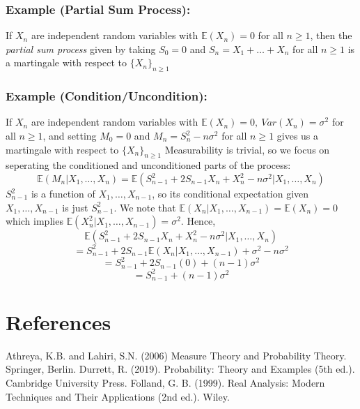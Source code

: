 \documentclass{article}
\begin{document}
\subsubsection{Example (Partial Sum Process):}
If $X_n$ are independent random variables with $\mathbb{E}(X_n)=0$ for all $n \geq1$, then the \emph{partial sum process} given by taking $S_0=0$ and $S_n=X_1+\ldots+X_n$ for all $n \geq 1$ is a martingale with respect to $\{X_n\}_{n\geq1}$
\subsubsection{Example (Condition/Uncondition):}
If $X_n$ are independent random variables with $\mathbb{E}(X_n)=0, \ Var(X_n)=\sigma^2$ for all $n \geq1$, and setting $M_0=0$ and $M_n=S_n^2-n\sigma^2$ for all $n\geq1$ gives us a martingale with respect to $\{X_n\}_{n\geq1}$ \newline \newline
Measurability is trivial, so we focus on seperating the conditioned and unconditioned parts of the process:
\[
\mathbb{E}(M_n|X_1,\ldots,X_n)=\mathbb{E}(S^2_{n-1}+2S_{n-1}X_n+X_n^2-n\sigma^2|X_1,\ldots,X_n)
\]
$S^2_{n-1}$ is a function of $X_1,\ldots,X_{n-1}$, so its conditional expectation given $X_1,\ldots,X_{n-1}$ is just $S^2_{n-1}$. We note that $\mathbb{E}(X_n|X_1,\ldots,X_{n-1})=\mathbb{E}(X_n)=0$ which implies $\mathbb{E}(X^2_n|X_1,\ldots,X_{n-1})=\sigma^2$. \newline \newline
Hence,
\[
\mathbb{E}(S^2_{n-1}+2S_{n-1}X_n+X_n^2-n\sigma^2|X_1,\ldots,X_n)
\]
\[
=S^2_{n-1}+2S_{n-1}\mathbb{E}(X_n|X_1,\ldots,X_{n-1})+\sigma^2-n\sigma^2
\]
\[
=S^2_{n-1}+2S_{n-1}(0)+(n-1)\sigma^2
\]
\[
=S^2_{n-1}+(n-1)\sigma^2
\]


\section{References}
Athreya, K.B. and Lahiri, S.N. (2006) Measure Theory and Probability Theory. Springer, Berlin. \newline \newline
Durrett, R. (2019). Probability: Theory and Examples (5th ed.). Cambridge University Press. \newline \newline
Folland, G. B. (1999). Real Analysis: Modern Techniques and Their Applications (2nd ed.). Wiley. \newline \newline 
\end{document}

